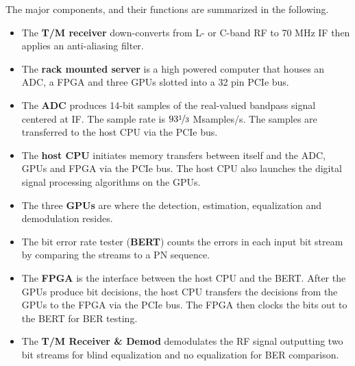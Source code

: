 The major components, and their functions are summarized in the following.
\begin{itemize}
	\item The \textbf{T/M receiver} down-converts from L- or C-band RF to 70 MHz IF then applies an anti-aliasing filter.
	\item The \textbf{rack mounted server} is a high powered computer that houses an ADC, a FPGA and three GPUs 		slotted into a 32 pin PCIe bus.
	\item The \textbf{ADC} produces 14-bit samples of the real-valued bandpass signal
	centered at IF. The sample rate is $93\nicefrac{1}{3}$ Msamples/s.
	The samples are transferred to the host CPU via the PCIe bus.
	\item The \textbf{host CPU} initiates memory transfers between itself and the ADC, GPUs and FPGA via the PCIe 	bus. 
	The host CPU also launches the digital signal processing algorithms on the GPUs.
	\item The three \textbf{GPUs} are where the detection, estimation, equalization and demodulation resides.
	\item The bit error rate tester (\textbf{BERT}) counts the errors in each input bit stream by comparing the 		streams to a PN sequence.
	\item The \textbf{FPGA} is the interface between the host CPU and the BERT. After the GPUs produce bit decisions, the host CPU transfers the decisions from the GPUs to the FPGA via the PCIe bus. The FPGA then clocks the bits out to the BERT for BER testing.
	\item The \textbf{T/M Receiver \& Demod} demodulates the RF signal outputting two bit streams for blind equalization and no equalization for BER comparison.
\end{itemize}

